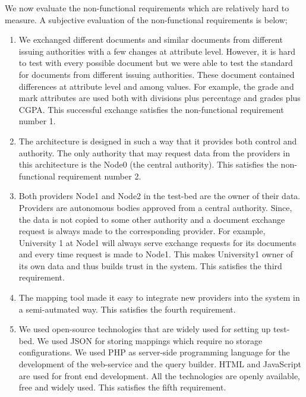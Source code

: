 \documentclass[12pt,a4paper,oneside]{book}
\begin{document}
	We now evaluate the non-functional requirements which are relatively hard to measure. A subjective evaluation of the non-functional requirements is below;
	
	\begin{enumerate}  

		\item We exchanged different documents and similar documents from different issuing authorities with a few changes at attribute level. However, it is hard to test with every possible document but we were able to test the standard for documents from different issuing authorities. These document contained differences at attribute level and among values. For example, the grade and mark attributes are used both with divisions plus percentage and grades plus CGPA. This successful exchange satisfies the non-functional requirement number 1.

		\item The architecture is designed in such a way that it provides both control and authority. The only authority that may request data from the providers in this architecture is the Node0 (the central authority). This satisfies the non-functional requirement number 2. 
	
		\item Both providers Node1 and Node2 in the test-bed are the owner of their data. Providers are autonomous bodies approved from a central authority. Since, the data is not copied to some other authority and a document exchange request is always made to the corresponding provider. For example, University 1 at Node1 will always serve exchange requests for its documents and every time request is made to Node1. This makes University1 owner of its own data and thus builds trust in the system. This satisfies the third requirement.
		
		\item The mapping tool made it easy to integrate new providers into the system in a semi-autmated way. This satisfies the fourth requirement. 
		
		\item We used open-source technologies that are widely used for setting up test-bed. We used JSON for storing mappings which require no storage configurations. We used PHP as server-side programming language for the development of the web-service and the query builder. HTML and JavaScript are used for front end development. All the technologies are openly available, free and widely used. This satisfies the fifth requirement.

	\end{enumerate}
		
\end{document}
